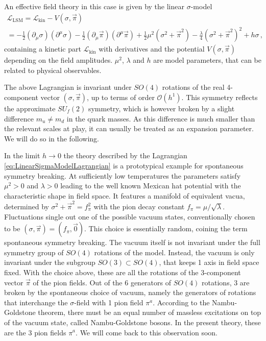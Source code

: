 An effective field theory in this case is given by the linear $\sigma$-model
\begin{multline}
    \mathscr{L}_{\text{LSM}}=\mathscr{L}_{\text{kin}}-V(\sigma,\vec{\pi})\\
    =-\frac{1}{2}(\partial_\mu\sigma)(\partial^\mu\sigma)-\frac{1}{2}(\partial_\mu\vec{\pi})(\partial^\mu\vec{\pi})
    +\frac{1}{2}\mu^2(\sigma^2+\vec{\pi}^2)-\frac{\lambda}{4}(\sigma^2+\vec{\pi}^2)^2+h\sigma\,,
    \label{eq:LinearSigmaModelLagrangian}
\end{multline}
containing a kinetic part $\mathscr{L}_{\text{kin}}$ with derivatives and the potential $V(\sigma,\vec{\pi})$ depending on the field amplitudes. $\mu^2$, $\lambda$ and $h$ are model parameters, that can be related to physical observables.

The above Lagrangian is invariant under $SO(4)$ rotations of the real 4-component vector ${(\sigma,\vec{\pi})}$, up to terms of order ${\mathcal{O}(h^1)}$. This symmetry reflects the approximate $SU_f(2)$ symmetry, which is however broken by a slight difference ${m_u\neq m_d}$ in the quark masses. As this difference is much smaller than the relevant scales at play, it can usually be treated as an expansion parameter. We will do so in the following.

In the limit ${h\to0}$ the theory described by the Lagrangian \eqref{eq:LinearSigmaModelLagrangian} is a prototypical example for spontaneous symmetry breaking. At sufficiently low temperatures the parameters satisfy ${\mu^2>0}$ and ${\lambda>0}$ leading to the well known Mexican hat potential with the characteristic shape in field space. It features a manifold of equivalent vacua, determined by $\sigma^2+\vec{\pi}^2=f_\pi^2$ with the pion decay constant ${f_\pi=\mu/\sqrt{\lambda}}$. Fluctuations single out one of the possible vacuum states, conventionally chosen to be $(\sigma,\vec{\pi})=(f_\pi,\vec{0})$. This choice is essentially random, coining the term spontaneous symmetry breaking. The vacuum itself is not invariant under the full symmetry group of $SO(4)$ rotations of the model. Instead, the vacuum is only invariant under the subgroup ${SO(3)\subset SO(4)}$, that keeps 1 axis in field space fixed. With the choice above, these are all the rotations of the 3-component vector $\vec{\pi}$ of the pion fields. Out of the 6 generators of $SO(4)$ rotations, 3 are broken by the spontaneous choice of vacuum, namely the generators of rotations that interchange the $\sigma$-field with 1 pion field $\pi^a$. According to the Nambu-Goldstone theorem, there must be an equal number of massless excitations on top of the vacuum state, called Nambu-Goldstone bosons. In the present theory, these are the 3 pion fields $\pi^a$. We will come back to this observation soon.

